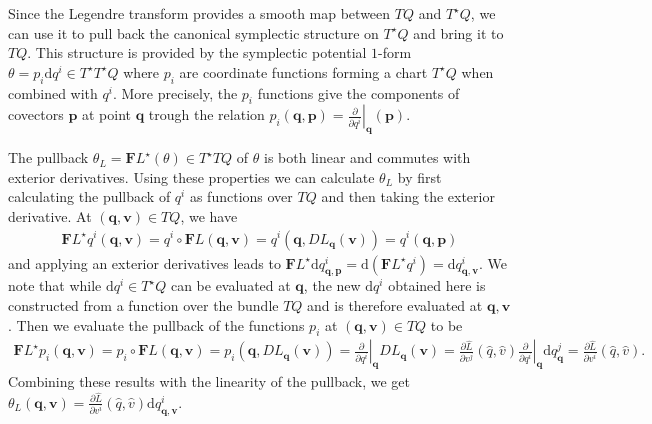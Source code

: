 \documentclass[10pt, a4paper]{article}
\begin{document}
{\begin{enumerate}
  Since the Legendre transform provides a smooth map between $TQ$ and $T^\star Q$, we can use it to pull back the canonical symplectic structure on $T^\star Q$ and bring it to $TQ$. This structure is provided by the symplectic potential $1$-form $\theta = p_i \text{d}q^i \in T^\star T^\star Q$ where $p_i$ are coordinate functions forming a chart $T^\star Q$ when combined with $q^i$. More precisely, the $p_i$ functions give the components of covectors $\mathbf{p}$ at point $\mathbf{q}$ trough the relation $p_{i}(\mathbf{q}, \mathbf{p}) = \left.\frac{\partial}{\partial q^i}\right|_\mathbf{q} (\mathbf{p})$.\medskip
  
  The pullback $\theta_L = \mathbf{F}L^{\star}(\theta) \in T^{\star} TQ$ of $\theta$ is both linear and commutes with exterior derivatives. Using these properties we can calculate $\theta_L$ by first calculating the pullback of $q^i$ as functions over $TQ$ and then taking the exterior derivative. At $(\mathbf{q}, \mathbf{v}) \in TQ$, we have 
  \begin{align*}
    \mathbf{F}L^{\star} q^i (\mathbf{q}, \mathbf{v}) = q^i \circ \mathbf{F}L (\mathbf{q}, \mathbf{v}) =  q^i(\mathbf{q}, DL_\mathbf{q}(\mathbf{v})) = q^i(\mathbf{q}, \mathbf{p})
  \end{align*}
  and applying an exterior derivatives leads to $\mathbf{F}L^{\star} \text{d} q^i_{\mathbf{q}, \mathbf{p}} = \text{d}(\mathbf{F}L^{\star} q^i) = \text{d}q^i_{\mathbf{q}, \mathbf{v}}$. We note that while $\text{d}q^i\in T^{\star}Q$ can be evaluated at $\mathbf{q}$, the new $\text{d}q^i$ obtained here is constructed from a function over the bundle $TQ$ and is therefore evaluated at $\mathbf{q}, \mathbf{v}$. Then we evaluate the pullback of the functions $p_{i}$ at $(\mathbf{q}, \mathbf{v}) \in TQ$ to be
  \begin{align*}
    \mathbf{F}L^{\star} p_i(\mathbf{q}, \mathbf{v}) = p_i \circ \mathbf{F}L (\mathbf{q}, \mathbf{v}) =  p_i (\mathbf{q}, DL_\mathbf{q}(\mathbf{v})) =  \left.\frac{\partial}{\partial q^i}\right|_\mathbf{q} DL_\mathbf{q}(\mathbf{v}) = \frac{\partial \hat{L}}{\partial v^j} (\hat{q}, \hat{v}) \left.\frac{\partial}{\partial q^i}\right|_\mathbf{q} \text{d}q^{j}_{\mathbf{q}} = \frac{\partial \hat{L}}{\partial v^i} (\hat{q}, \hat{v}).
  \end{align*}
  Combining these results with the linearity of the pullback, we get $\theta_L(\mathbf{q}, \mathbf{v}) = \frac{\partial \hat{L}}{\partial v^i} (\hat{q}, \hat{v}) \text{d}q^{i}_{\mathbf{q}, \mathbf{v}}$. 

\end{enumerate}}
\end{document}
